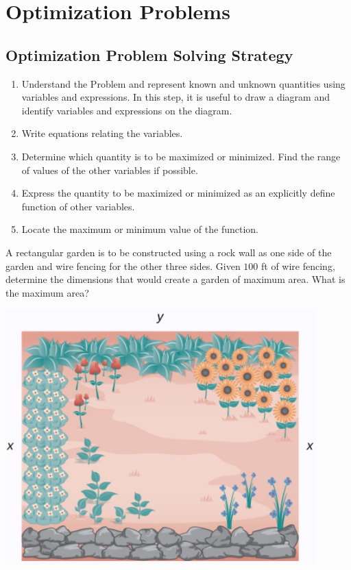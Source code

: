 
\hypertarget{optimization-problems}{%
\section{Optimization Problems}\label{optimization-problems}}

\hypertarget{optimization-problem-solving-strategy}{%
\subsection{Optimization Problem Solving
Strategy}\label{optimization-problem-solving-strategy}}

\begin{enumerate}[sepno]
\item
  Understand the Problem and represent known and unknown quantities
  using variables and expressions. In this step, it is useful to draw a
  diagram and identify variables and expressions on the diagram.
\item
  Write equations relating the variables.
\item
  Determine which quantity is to be maximized or minimized. Find the
  range of values of the other variables if possible.
\item
  Express the quantity to be maximized or minimized as an explicitly
  define function of other variables.
\item
  Locate the maximum or minimum value of the function.
\end{enumerate}

\begin{example}

A rectangular garden is to be constructed using a rock wall as one side
of the garden and wire fencing for the other three sides. Given \(100\)
ft of wire fencing, determine the dimensions that would create a garden
of maximum area. What is the maximum area?

\includegraphics[width=0.9\textwidth]{img/image-20200420233408884.png}

\end{example}
\vspace*{6\baselineskip}

